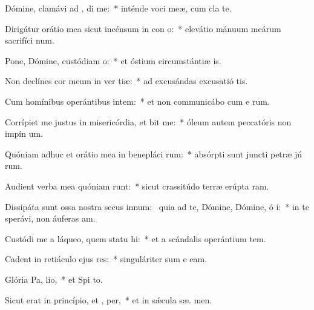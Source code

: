 \item Dómine, clamávi ad , di me:~* inténde voci meæ, cum cla  te.
\item Dirigátur orátio mea sicut incénsum in con o:~* elevátio mánuum meárum sacrifíci num.
\item Pone, Dómine, custódiam  o:~* et óstium circumstántiæ  is.
\item Non declínes cor meum in ver tiæ:~* ad excusándas excusatió  tis.
\item Cum homínibus operántibus intem:~* et non communicábo cum e rum.
\item Corrípiet me justus in misericórdia, et bit me:~* óleum autem peccatóris non impín  um.
\item Quóniam adhuc et orátio mea in benepláci rum:~* absórpti sunt juncti petræ jú rum.
\item Audient verba mea quóniam runt:~* sicut crassitúdo terræ erúpta   ram.
\item Dissipáta sunt ossa nostra secus innum:~\pscross{} quia ad te, Dómine, Dómine, ó i:~* in te sperávi, non áuferas  am.
\item Custódi me a láqueo, quem statu hi:~* et a scándalis operántium tem.
\item Cadent in retiáculo ejus res:~* singuláriter sum e  eam.
\item Glória Pa,  lio,~* et Spi to.
\item Sicut erat in princípio, et ,  per,~* et in sǽcula sæ. men.
